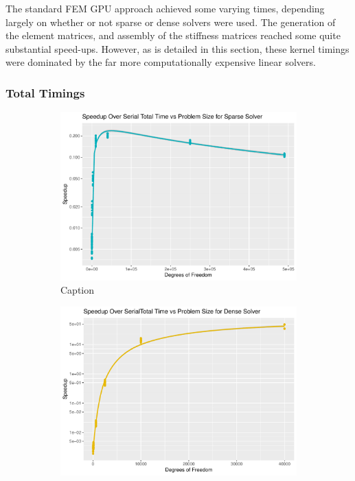 The standard FEM GPU approach achieved some varying times, depending largely on whether or not sparse or dense solvers were used. The generation of the element matrices, and assembly of the stiffness matrices reached some quite substantial speed-ups. However, as is detailed in this section, these kernel timings were dominated by the far more computationally expensive linear solvers.

\subsubsection{Total Timings}

\begin{figure}
	\centering
	\begin{subfigure}{0.48\linewidth}
		\centering
		\includegraphics[width = \linewidth]{Plots/total_sparse_cpu_speedup_vs_n}
		\caption{Caption}
		\label{fig:tot_sparse}
	\end{subfigure}\hfill
	\begin{subfigure}{0.48\linewidth}
		\centering
		\includegraphics[width=\linewidth]{Plots/total_dense_cpu_speedup_vs_n}

\end{subfigure}
\end{figure}
